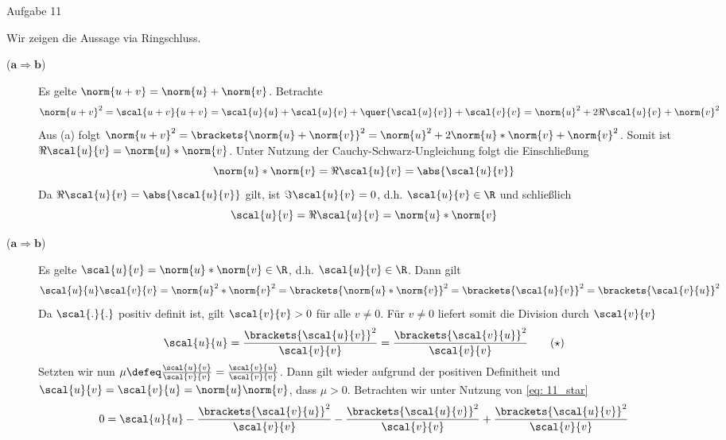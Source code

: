 \begin{exercisePage}[Hilberträume][10.5/15]
	Aufgabe 11

Wir zeigen die Aussage via Ringschluss.
\begin{description}
	\item[($\mathbf{a \Rightarrow b}$)] Es gelte $\norm{u+v} = \norm{u} + \norm{v}$. Betrachte 
	\begin{equation*}
		\norm{u+v}^2 = \scal{u+v}{u+v} = \scal{u}{u} + \scal{u}{v} + \quer{\scal{u}{v}} + \scal{v}{v} = \norm{u}^2 + 2 \Re \scal{u}{v} + \norm{v}^2
	\end{equation*}
	Aus (a) folgt  $\norm{u+v}^2 = \brackets{\norm{u} + \norm{v}}^2 = \norm{u}^2 + 2 \norm{u} * \norm{v} + \norm{v}^2$. Somit ist $\Re \scal{u}{v} = \norm{u} * \norm{v}$. Unter Nutzung der Cauchy-Schwarz-Ungleichung folgt die Einschließung
	\begin{equation*}
		\norm{u} * \norm{v} = \Re \scal{u}{v} = \abs{\scal{u}{v}}
	\end{equation*} 
	Da $\Re \scal{u}{v} = \abs{\scal{u}{v}}$ gilt, ist $\Im \scal{u}{v} = 0$, d.h. $\scal{u}{v} \in \R$ und schließlich
	\begin{equation*}
		\scal{u}{v} = \Re \scal{u}{v} = \norm{u} * \norm{v}
	\end{equation*}
	\item[($\mathbf{a \Rightarrow b}$)] Es gelte $\scal{u}{v} = \norm{u} * \norm{v} \in \R$, d.h. $\scal{u}{v} \in \R$. Dann gilt
	\begin{equation*}
		\scal{u}{u} \scal{v}{v} = \norm{u}^2 * \norm{v}^2 = \brackets{\norm{u} * \norm{v}}^2 = \brackets{\scal{u}{v}}^2 = \brackets{\scal{v}{u}}^2
	\end{equation*}
	Da $\scal{.}{.}$ positiv definit ist, gilt $\scal{v}{v} > 0$ für alle $v \neq 0$. Für $v \neq 0$ liefert somit die Division durch $\scal{v}{v}$
	\begin{equation*}
		\scal{u}{u} = \frac{\brackets{\scal{u}{v}}^2}{\scal{v}{v}} = \frac{\brackets{\scal{v}{u}}^2}{\scal{v}{v}} \tag{$\star$} \label{eq: 11_star}
	\end{equation*}
	Setzten wir nun $\mu \defeq \frac{\scal{u}{v}}{\scal{v}{v}} = \frac{\scal{v}{u}}{\scal{v}{v}}$. Dann gilt wieder aufgrund der positiven Definitheit und $\scal{u}{v} = \scal{v}{u} = \norm{u} \norm{v}$, dass $\mu > 0$. Betrachten wir unter Nutzung von \eqref{eq: 11_star}
	\begin{align*}
		0 &= \scal{u}{u} - \frac{\brackets{\scal{v}{u}}^2}{\scal{v}{v}} - \frac{\brackets{\scal{u}{v}}^2}{\scal{v}{v}} + \frac{\brackets{\scal{u}{v}}^2}{\scal{v}{v}} \\

\end{align*}
\end{description}
\end{exercisePage}
